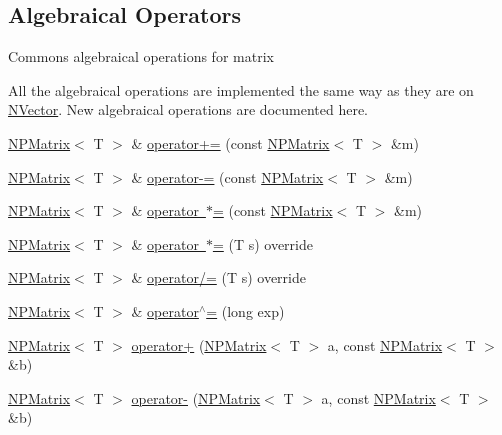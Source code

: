 \subsection*{Algebraical Operators}
\label{_amgrp3551c228ed792030edc3367553a30343}%
Commons algebraical operations for matrix

All the algebraical operations are implemented the same way as they are on {\ttfamily \mbox{\hyperlink{class_n_vector}{N\+Vector}}}. New algebraical operations are documented here. \begin{DoxyCompactItemize}
\item 
\mbox{\hyperlink{class_n_p_matrix}{N\+P\+Matrix}}$<$ T $>$ \& \mbox{\hyperlink{class_n_p_matrix_a80155cd4a89df4bffcce2e67dad5d163}{operator+=}} (const \mbox{\hyperlink{class_n_p_matrix}{N\+P\+Matrix}}$<$ T $>$ \&m)
\item 
\mbox{\hyperlink{class_n_p_matrix}{N\+P\+Matrix}}$<$ T $>$ \& \mbox{\hyperlink{class_n_p_matrix_af69b2b25137954658c5941e733aebfb5}{operator-\/=}} (const \mbox{\hyperlink{class_n_p_matrix}{N\+P\+Matrix}}$<$ T $>$ \&m)
\item 
\mbox{\hyperlink{class_n_p_matrix}{N\+P\+Matrix}}$<$ T $>$ \& \mbox{\hyperlink{class_n_p_matrix_a72e1b54eb9a6dc5b7a42047985d86e13}{operator $\ast$=}} (const \mbox{\hyperlink{class_n_p_matrix}{N\+P\+Matrix}}$<$ T $>$ \&m)
\item 
\mbox{\hyperlink{class_n_p_matrix}{N\+P\+Matrix}}$<$ T $>$ \& \mbox{\hyperlink{class_n_p_matrix_a7e0436ab2932534fe9f0a15db4a5560e}{operator $\ast$=}} (T s) override
\item 
\mbox{\hyperlink{class_n_p_matrix}{N\+P\+Matrix}}$<$ T $>$ \& \mbox{\hyperlink{class_n_p_matrix_a0150ab8322e2ea4a2550531dda3dfabd}{operator/=}} (T s) override
\item 
\mbox{\hyperlink{class_n_p_matrix}{N\+P\+Matrix}}$<$ T $>$ \& \mbox{\hyperlink{class_n_p_matrix_abfcd24ec4d59beeefc5574a299641605}{operator$^\wedge$=}} (long exp)
\item 
\mbox{\hyperlink{class_n_p_matrix}{N\+P\+Matrix}}$<$ T $>$ \mbox{\hyperlink{class_n_p_matrix_aa3388754bcd5226d11ca97c258864300}{operator+}} (\mbox{\hyperlink{class_n_p_matrix}{N\+P\+Matrix}}$<$ T $>$ a, const \mbox{\hyperlink{class_n_p_matrix}{N\+P\+Matrix}}$<$ T $>$ \&b)
\item 
\mbox{\hyperlink{class_n_p_matrix}{N\+P\+Matrix}}$<$ T $>$ \mbox{\hyperlink{class_n_p_matrix_aeaf32670ee97547e19c84b9980f35914}{operator-\/}} (\mbox{\hyperlink{class_n_p_matrix}{N\+P\+Matrix}}$<$ T $>$ a, const \mbox{\hyperlink{class_n_p_matrix}{N\+P\+Matrix}}$<$ T $>$ \&b)

\end{DoxyCompactItemize}
